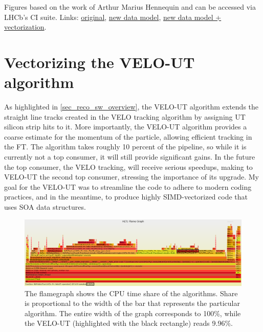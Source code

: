 \documentclass[12pt]{article}
\begin{document}
{
	\small
	Figures based on the work of Arthur Marius Hennequin and can be accessed via LHCb's CI suite. Links:
	\href{http://lhcbpr-hlt.web.cern.ch/lhcbpr-hlt/PerfTests/UpgradeThroughput/Throughput_lhcb-head.2269_VeloOnly_x86_64+avx2+fma-centos7-gcc8-opt_2019-06-15_08:35:21_+0200/}{original},
	\href{http://lhcbpr-hlt.web.cern.ch/lhcbpr-hlt/PerfTests/UpgradeThroughput/Throughput_lhcb-head.2270_VeloOnly_x86_64+avx2+fma-centos7-gcc8-opt_2019-06-16_08:37:10_+0200/}{new data model},
	\href{http://lhcbpr-hlt.web.cern.ch/lhcbpr-hlt/PerfTests/UpgradeThroughput/Throughput_lhcb-head.2270_VeloOnlySIMD_x86_64+avx2+fma-centos7-gcc8-opt_2019-06-16_07:03:15_+0200/}{new data model + vectorization}.

}

\newpage
\section{Vectorizing the VELO-UT algorithm}\label{sec_opt_velout}

As highlighted in \ref{sec_reco_sw_overview}, the VELO-UT algorithm extends the straight line tracks created in the VELO tracking algorithm by assigning UT silicon strip hits to it. More importantly, the VELO-UT algorithm provides a coarse estimate for the momentum of the particle, allowing efficient tracking in the FT.
The algorithm takes roughly 10 percent of the pipeline, so while it is currently not a top consumer, it will still provide significant gains. In the future the top consumer, the VELO tracking, will receive serious speedups, making to VELO-UT the second top consumer, stressing the importance of its upgrade. My goal for the VELO-UT was to streamline the code to adhere to modern coding practices, and in the meantime, to produce highly SIMD-vectorized code that uses SOA data structures.


\begin{figure}[H]
	\begin{center}
		\includegraphics[width=\textwidth]{velout_flamegraph}
	\end{center}
	\caption{The flamegraph shows the CPU time share of the algorithms. Share is proportional to the width of the bar that represents the particular algorithm. The entire width of the graph corresponds to 100\%, while the VELO-UT (highlighted with the black rectangle) reads 9.96\%.}
	\label{fig_velout_flamegraph}
\end{figure}
\end{document}

